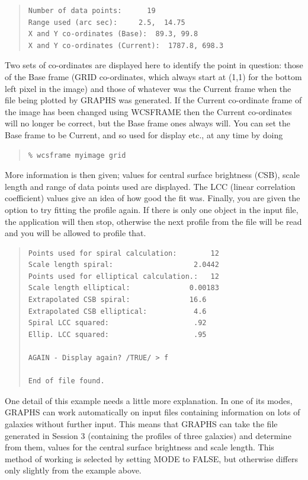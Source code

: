 \documentclass[twoside,11pt]{article}
\newcommand{\xref}[3]{#1}
\newenvironment{myquote}{\begin{quote}\begin{small}}{\end{small}\end{quote}}
\begin{document}
\begin{myquote}
\begin{verbatim}
Number of data points:      19
Range used (arc sec):     2.5,  14.75
X and Y co-ordinates (Base):  89.3, 99.8
X and Y co-ordinates (Current):  1787.8, 698.3
\end{verbatim}
\end{myquote}

Two sets of co-ordinates are displayed here to identify the point
in question: those of the Base frame (GRID co-ordinates, which
always start at (1,1) for the bottom left pixel in the image)
and those of whatever was the Current frame when the
file being plotted by GRAPHS was generated.
If the Current co-ordinate frame of the image has been changed
using \xref{WCSFRAME}{sun95}{WCSFRAME} then the Current co-ordinates
will no longer be correct, but the Base frame ones always will.
You can set the Base frame to be Current,
and so used for display etc.,
at any time by doing
\begin{myquote}
\begin{verbatim}
% wcsframe myimage grid
\end{verbatim}
\end{myquote}

More information is then given;
values for central surface brightness (CSB), scale length and
range of data points used are displayed. The LCC (linear correlation
coefficient) values give an idea of how good the fit was. Finally, you are
given the option to try fitting the profile again. If there is only one
object in the input file, the application will then stop, otherwise the
next profile from the file will be read and you will be allowed to profile
that.

\begin{myquote}
\begin{verbatim}
Points used for spiral calculation:        12
Scale length spiral:                   2.0442
Points used for elliptical calculation.:   12
Scale length elliptical:              0.00183
Extrapolated CSB spiral:              16.6
Extrapolated CSB elliptical:           4.6
Spiral LCC squared:                    .92
Ellip. LCC squared:                    .95

AGAIN - Display again? /TRUE/ > f

End of file found.
\end{verbatim}
\end{myquote}

One detail of this example needs a little more explanation. In one
of its modes, GRAPHS can work automatically on input files
containing information on lots of galaxies without further
input. This means that GRAPHS can take the file generated in Session
3 (containing the profiles of three galaxies) and determine from them,
values for the central surface brightness and scale length.
This method of working is selected by setting MODE to FALSE, but otherwise
differs only slightly from the example above.
\end{document}
